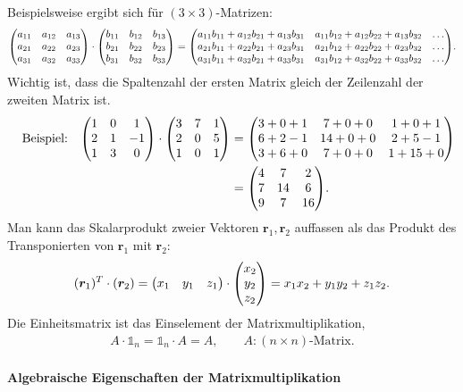 Beispielsweise ergibt sich für $(3\times 3)$-Matrizen: 
\begin{align}
    \mqty(a_{11} & a_{12} & a_{13}\\ a_{21} & a_{22} & a_{23} \\ a_{31} & a_{32} & a_{33}) \cdot \mqty(b_{11} & b_{12} & b_{13}\\ b_{21} & b_{22} & b_{23} \\ b_{31} & b_{32} & b_{33}) = \mqty(
    a_{11} b_{11} + a_{12} b_{21} + a_{13} b_{31} & a_{11} b_{12} + a_{12} b_{22} + a_{13} b_{32} & \hdots\\
    a_{21} b_{11} + a_{22} b_{21} + a_{23} b_{31} & a_{21} b_{12} + a_{22} b_{22} + a_{23} b_{32} & \hdots\\
    a_{31} b_{11} + a_{32} b_{21} + a_{33} b_{31} & a_{31} b_{12} + a_{32} b_{22} + a_{33} b_{32} & \hdots).
\end{align}
Wichtig ist, dass die Spaltenzahl der ersten Matrix gleich der Zeilenzahl der zweiten Matrix ist. 
\begin{align}
    \qq{Beispiel:} \mqty(1 & 0 & 1 \\ 2 & 1 & -1 \\ 1 & 3 & 0) \cdot \mqty(3 & 7 & 1 \\ 2 & 0 & 5 \\ 1 & 0 & 1) &=\mqty(3+0+1 & 7+0+0 & 1+0+1 \\ 6+2-1 & 14+0+0 & 2+5-1 \\ 3+6+0 & 7+0+0 & 1+15+0) \notag \\
    &= \mqty(4 & 7 & 2 \\ 7&14&6\\9&7&16). 
\end{align}
Man kann das Skalarprodukt zweier Vektoren $\bm{r}_1, \bm{r}_2$ auffassen als das Produkt des Transponierten von $\bm{r}_1$ mit $\bm{r}_2$: 
\begin{align}
    (\bm{r}_1)^T \cdot (\bm{r}_2) = \mqty(x_1 & y_1 & z_1) \cdot \mqty(x_2 \\y_2 \\z_2) = x_1 x_2 + y_1y_2 + z_1z_2.
\end{align} 
Die Einheitsmatrix ist das Einselement der Matrixmultiplikation, 
\begin{align}
    A \cdot \mathds{1}_n = \mathds{1}_n \cdot A = A, \qquad A:(n\times n)\text{-Matrix.}
\end{align}

\paragraph{Algebraische Eigenschaften der Matrixmultiplikation}$~$

